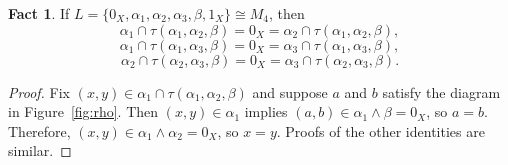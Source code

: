 \documentclass{amsart}
\theoremstyle{plain}
\theoremstyle{definition}
\newtheorem{fact}{Fact}
\theoremstyle{definition}
\numberwithin{equation}{section}
\newcommand{\<}{\ensuremath{\langle}}
\renewcommand{\>}{\ensuremath{\rangle}}
\newcommand{\meet}{\ensuremath{\wedge}}
\begin{document}
\begin{fact} If 
$L = \{0_X, \alpha_1, \alpha_2, \alpha_3, \beta, 1_X\} \cong  M_4$,
then
  \[
\alpha_1 \cap \tau(\alpha_1, \alpha_2, \beta)
= 0_X =  \alpha_2 \cap \tau(\alpha_1, \alpha_2, \beta),
\]
\[
\alpha_1 \cap \tau(\alpha_1, \alpha_3, \beta)
= 0_X =  \alpha_3 \cap \tau(\alpha_1, \alpha_3, \beta),
\]
\[
\alpha_2 \cap \tau(\alpha_2, \alpha_3, \beta)
 = 0_X = \alpha_3 \cap \tau(\alpha_2, \alpha_3, \beta).
\]
\end{fact}
\begin{proof}
  Fix $(x,y) \in  \alpha_1 \cap \tau(\alpha_1, \alpha_2, \beta)$ and suppose 
  $a$ and $b$ satisfy the diagram in Figure~\ref{fig:rho}.  Then 
  $(x,y) \in \alpha_1$ implies $(a, b)\in \alpha_1 \meet \beta = 0_X$, so 
  $a = b$.  Therefore, $(x,y) \in \alpha_1 \meet \alpha_2 = 0_X$, so $x = y$.
  Proofs of the other identities are similar.
\end{proof}
\end{document}
